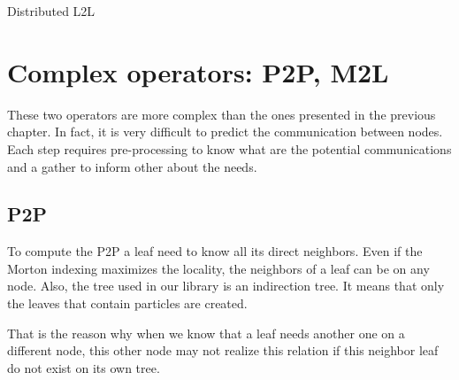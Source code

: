 \documentclass[12pt,letterpaper,titlepage]{report}
\begin{document}
\BlankLine
\begin{algorithm}[H]
  \LinesNumbered
  \SetAlgoLined
  \BlankLine
  \BlankLine
  \caption{Distributed L2L}
\end{algorithm}
\chapter{Complex operators: P2P, M2L}
These two operators are more complex than the ones presented in the previous chapter.
In fact, it is very difficult to predict the communication between nodes.
Each step requires pre-processing to know what are the potential communications and a gather to inform other about the needs.
\section{P2P}
To compute the P2P a leaf need to know all its direct neighbors.
Even if the Morton indexing maximizes the locality, the neighbors of a leaf can be on any node.
Also, the tree used in our library is an indirection tree.
It means that only the leaves that contain particles are created.

That is the reason why when we know that a leaf needs another one on a
different node, this other node may not realize this relation if this
neighbor leaf do not exist on its own tree.
\end{document}
